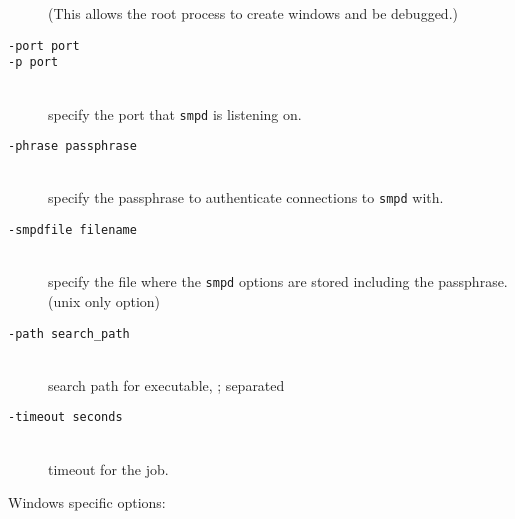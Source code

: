\documentclass[dvipdfm,11pt]{article}
\begin{document}
\begin{description}
  (This allows the root process to create windows and be debugged.)
\item[\texttt{-port port}]
\item[\texttt{-p port}]\mbox{}\\
  specify the port that \texttt{smpd} is listening on.
\item[\texttt{-phrase passphrase}]\mbox{}\\
  specify the passphrase to authenticate connections to \texttt{smpd} with.
\item[\texttt{-smpdfile filename}]\mbox{}\\
  specify the file where the \texttt{smpd} options are stored including the 
passphrase. (unix only option)
\item[\texttt{-path search\_path}]\mbox{}\\
  search path for executable, ; separated
\item[\texttt{-timeout seconds}]\mbox{}\\
  timeout for the job. 
\end{description}
Windows specific options:
\end{document}
